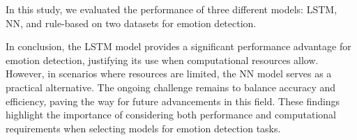 In this study, we evaluated the performance of three different models: LSTM,
NN, and rule-based on two datasets for emotion detection.

In conclusion, the LSTM model provides a significant performance advantage
for emotion detection, justifying its use when computational resources allow.
However, in scenarios where resources are limited, the NN model serves as a
practical alternative. The ongoing challenge remains to balance accuracy and
efficiency, paving the way for future advancements in this field.
These findings highlight the importance of considering both performance and
computational requirements when selecting models for emotion detection tasks.
